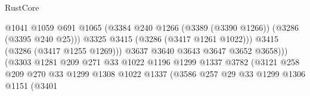 \begin{lexlean}{RustCore}
\begin{coremodule}
                                                    @1041
                                                    @1059
                                                    @691
                                                    @1065
                                                    (@3384
                                                      @240
                                                      @1266
                                                      (@3389 (@3390 @1266))
                                                      (@3286 (@3395 @240 @25)))
                                                    @3325
                                                    @3415
                                                    (@3286 (@3417 @1261 @1022)))
                                                  @3415
                                                  (@3286 (@3417 @1255 @1269)))
                                                @3637
                                                @3640
                                                @3643
                                                @3647
                                                @3652
                                                @3658)))
                                          (@3303
                                            @1281
                                            @209
                                            @271
                                            @33
                                            @1022
                                            @1196
                                            @1299
                                            @1337
                                            @3782
                                            (@3121
                                              @258
                                              @209
                                              @270
                                              @33
                                              @1299
                                              @1308
                                              @1022
                                              @1337
                                              (@3586
                                                @257
                                                @29
                                                @33
                                                @1299
                                                @1306
                                                @1151
                                                (@3401

\end{coremodule}
\end{lexlean}
